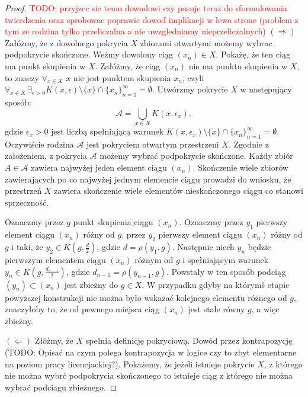 \documentclass[licencjacka]{pwr_wmat_praca_dyplomowa}
\theoremstyle{plain}
\numberwithin{theorem}{chapter}
\theoremstyle{definition}
\numberwithin{theorem}{chapter}
\begin{document}
\begin{proof}
\textcolor{red}{TODO: przyjzec sie temu dowodowi czy pasuje teraz do sformulowania twierdzenia oraz sprobowac poprawic dowod  implikacji w lewa strone (problem z tym ze rodzina tylko przeliczalna a nie uwzgledniamy nieprzeliczalnych)}
$(\Rightarrow)$
Załóżmy, że z dowolnego pokrycia $X$ zbiorami otwartymi możemy wybrac podpokrycie skończone. Weźmy dowolony ciąg $(x_n) \in X$. Pokażę, że ten ciąg ma punkt skupienia w $X$. Załóżmy, że ciąg $(x_n)$ nie ma punktu skupienia w $X$, to znaczy $\forall_{x \in X}$ $x$ nie jest punktem skupienia $x_n$, czyli $\forall_{x \in X} \, \exists_{\epsilon > 0}  K(x, \epsilon) \setminus \{x\} \cap \{x_n\}_{n=1}^{\infty} = \emptyset$. Utwórzmy pokrycie $X$ w następujący sposób: $$\mathcal{A} = \bigcup_{x \in X} K(x, \epsilon_x),$$ gdzie $\epsilon_x > 0$ jest liczbą spełniającą warunek $K(x, \epsilon_x) \setminus \{x\} \cap \{x_n\}_{n=1}^{\infty} = \emptyset$. Oczywiście rodzina $\mathcal{A}$ jest pokryciem otwartym przestrzeni $X$. Zgodnie z założeniem, z pokrycia $\mathcal{A}$ możemy wybrać podpokrycie skończone. Każdy zbiór $A \in \mathcal{A}$ zawiera najwyżej jeden element ciągu $(x_n)$. Skończenie wiele zbiorów zawierających po co najwyżej jednym elemencie ciągu prowadzi do wniosku, że przestrzeń $X$ zawiera skończenie wiele elementów nieskończonego ciągu co stanowi sprzeczność.

Oznaczmy przez $g$ punkt skupienia ciągu $(x_n)$. Oznaczmy przez $y_1$ pierwszy element ciągu $(x_n)$ różny od $g$. przez $y_2$ pierwszy element ciągu $(x_n)$ różny od $g$ i taki, że $y_2 \in K(g, \frac{d}{2})$, gdzie $d = \rho(y_1, g)$.
Następnie niech $y_n$ będzie pierwszym elementem ciągu $(x_n)$ różnym od $g$ i spełniającym warunek $y_n \in K(g, \frac{d_{n-1}}{2})$, gdzie $d_{n-1} = \rho(y_{n-1}, g)$. Powstały w ten sposób podciąg $(y_n) \subset (x_n)$ jest zbieżny do $g \in X$. W przypadku gdyby na którymś etapie powyższej konstrukcji nie można było wskazać kolejnego elementu różnego od $g$, znaczyłoby to, że od pewnego miejsca ciąg $(x_n)$ jest stale równy $g$, a więc zbieżny.

$(\Leftarrow)$
Złóżmy, że $X$ spełnia definicję pokryciową.
Dowód przez kontrapozycję (TODO: Opisać na czym polega kontrapozycja w logice czy to zbyt elementarne na poziom pracy licencjackiej?). Pokażemy, że jeżeli istnieje pokrycie $X$, z którego nie można wybrć podpokrycia skończonego to istnieje ciąg z którego nie można wybrać podciagu zbieżnego.


\end{proof}
\end{document}
